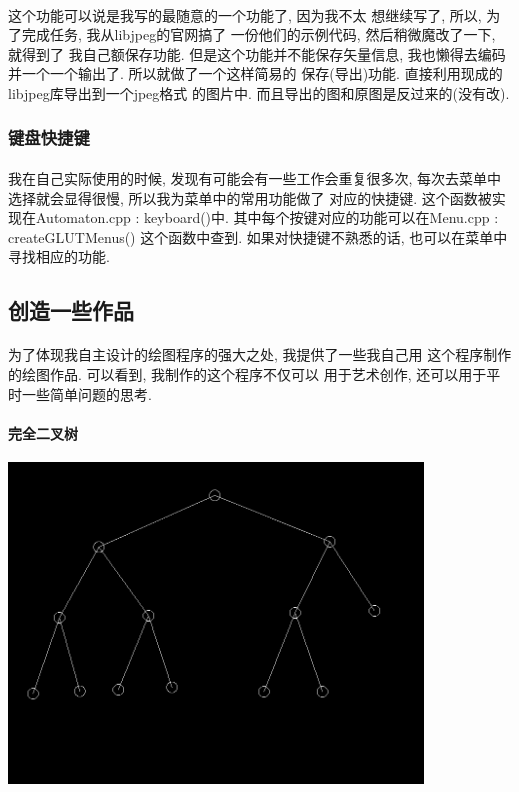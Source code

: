 \documentclass{article}
\begin{document}
			\paragraph{}
				这个功能可以说是我写的最随意的一个功能了, 因为我不太
				想继续写了, 所以, 为了完成任务, 我从libjpeg的官网搞了
				一份他们的示例代码, 然后稍微魔改了一下, 就得到了
				我自己额保存功能. 但是这个功能并不能保存矢量信息, 
				我也懒得去编码并一个一个输出了. 所以就做了一个这样简易的
				保存(导出)功能. 直接利用现成的libjpeg库导出到一个jpeg格式
				的图片中. 而且导出的图和原图是反过来的(没有改).
		\subsubsection{键盘快捷键}
			\paragraph{}
				我在自己实际使用的时候, 发现有可能会有一些工作会重复很多次,
				每次去菜单中选择就会显得很慢, 所以我为菜单中的常用功能做了
				对应的快捷键.
				这个函数被实现在Automaton.cpp : keyboard()中. 
				其中每个按键对应的功能可以在Menu.cpp : createGLUTMenus()
				这个函数中查到.
				如果对快捷键不熟悉的话, 也可以在菜单中寻找相应的功能.
	\subsection{创造一些作品}
		\paragraph{}
			为了体现我自主设计的绘图程序的强大之处, 我提供了一些我自己用
			这个程序制作的绘图作品. 可以看到, 我制作的这个程序不仅可以
			用于艺术创作, 还可以用于平时一些简单问题的思考.
			\clearpage
		\paragraph{完全二叉树}
			\begin{center}
				\includegraphics[width = 11cm]{tree.jpeg} \\
			\end{center}
\end{document}
